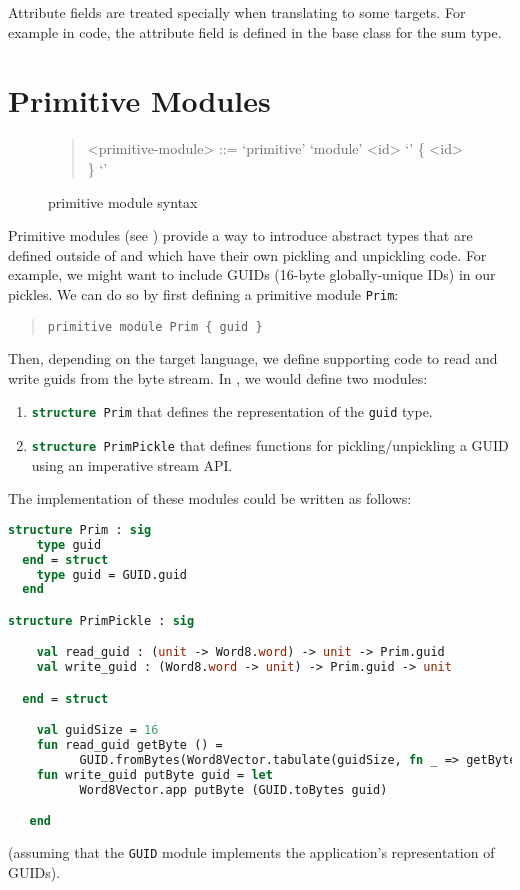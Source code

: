 Attribute fields are treated specially when translating to some targets.
For example in \Cplusplus{} code, the attribute field is defined in the base class for the sum type.

\section{Primitive Modules}
\label{sec:primitive-syntax}

\begin{figure}[t]
  \begin{quote}
    \begin{grammar}
      <primitive-module> ::= `primitive' `module' <id> `{' \{ <id> \} `}'
    \end{grammar}%
  \end{quote}%
  \caption{\asdl{} primitive module syntax}
  \label{fig:prim-module-syntax}
\end{figure}%

Primitive modules (see ) provide a way to introduce abstract
types that are defined outside
of \asdl{} and which have their own pickling and unpickling code.
For example, we might want to include GUIDs (16-byte globally-unique IDs) in our pickles.
We can do so by first defining a primitive module \lstinline!Prim!:
%
\begin{quote}\begin{lstlisting}[language=ASDL]
primitive module Prim { guid }
\end{lstlisting}\end{quote}%
%
Then, depending on the target language, we define
supporting code to read and write guids from the byte stream.
In \sml{}, we would define two modules:
\begin{enumerate}
  \item \lstinline[language=SML]!structure Prim! that defines the representation of the
    \lstinline[language=SML]!guid! type.
  \item
    \lstinline[language=SML]!structure PrimPickle! that defines functions
    for pickling/unpickling a GUID using an imperative stream API.
\end{enumerate}%
The \sml{} implementation of these modules could be written as follows:
\begin{code}\begin{lstlisting}[language=SML]
structure Prim : sig
    type guid
  end = struct
    type guid = GUID.guid
  end

structure PrimPickle : sig

    val read_guid : (unit -> Word8.word) -> unit -> Prim.guid
    val write_guid : (Word8.word -> unit) -> Prim.guid -> unit

  end = struct

    val guidSize = 16
    fun read_guid getByte () =
          GUID.fromBytes(Word8Vector.tabulate(guidSize, fn _ => getByte()))
    fun write_guid putByte guid = let
          Word8Vector.app putByte (GUID.toBytes guid)

   end
\end{lstlisting}\end{code}%
(assuming that the \lstinline!GUID! module implements the application's representation
of GUIDs).

